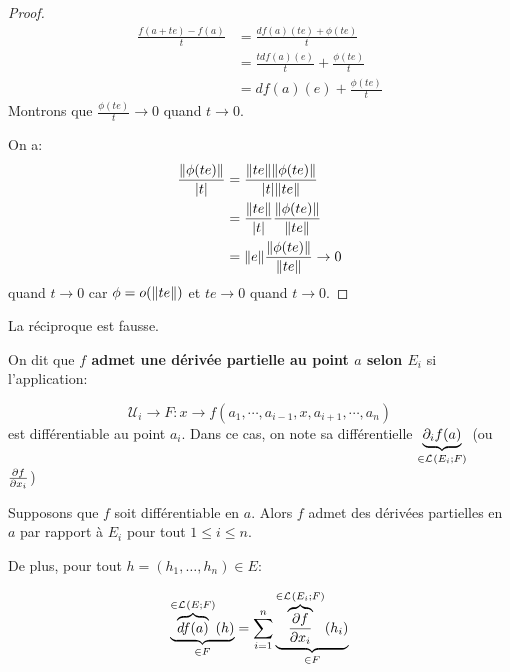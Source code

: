 \ifdefined\outputproof
\begin{proof}
\begin{align}
	\displaystyle \frac{f(a + te) - f(a)}{t}
	&= \frac{df(a)(te) + \phi(te)}{t}\\
	&= \frac{t df(a)(e)}{t} + \frac{\phi(te)}{t} \\
	&= df(a)(e) + \frac{\phi(te)}{t}
\end{align}
	Montrons que $\displaystyle \frac{\phi(te)}{t} \rightarrow 0$ quand $t
	\rightarrow 0$.

	On a:
	\begin{align*}
		\frac{\norm{\phi(te)}}{|t|}
		& = \frac{\norm{te} \norm{\phi(te)}}{\abs{t} \norm{te}} \\
		& = \frac{\norm{te}}{\abs{t}} \frac{\norm{\phi(te)}}{\norm{te}} \\
		& = \norm{e} \frac{\norm{\phi(te)}}{\norm{te}} \rightarrow 0
	\end{align*}
	quand $t \rightarrow 0$ car $\phi = o(\norm{te})$ et $te \rightarrow 0$
	quand $t \rightarrow 0$.
\end{proof}
\fi

\begin{remarque}
	La réciproque est fausse.
\end{remarque}

\begin{definition}
	\label{partial_application_definition}
	On dit que \textbf{$f$ admet une dérivée partielle au point $a$ selon
		$E_{i}$} si l'application:

	\begin{equation*}
		\mathcal{U}_{i} \rightarrow F : x \rightarrow f(a_{1}, \cdots, a_{i -
		1}, x, a_{i + 1}, \cdots, a_{n})
	\end{equation*}
	est différentiable au point $a_{i}$. Dans ce cas, on note sa différentielle
	$\underbrace{\partial_{i} f(a)}_{\in \mathcal{L}_{}(E_{i}; F)}$ (ou
	$\pdv{f}{x_{i}} (a)$)
\end{definition}

\begin{proposition}
	Supposons que $f$ soit différentiable en $a$. Alors $f$ admet des dérivées
	partielles en $a$ par rapport à $E_{i}$ pour tout $1 \leq i \leq n$.

	De plus, pour tout $h = (h_{1}, \ldots, h_{n}) \in E$:

	\begin{equation*}
		\underbrace{\overbrace{df(a)}^{\in \mathcal{L}_{}(E; F)}(h)}_{\in F} =
		\displaystyle \sum_{i = 1}^{n} \underbrace{\overbrace{\pdv{f}{x_{i}} (a)}^{\in
			\mathcal{L}_{}(E_{i}; F)} (h_{i})}_{\in F}
	\end{equation*}
\end{proposition}


